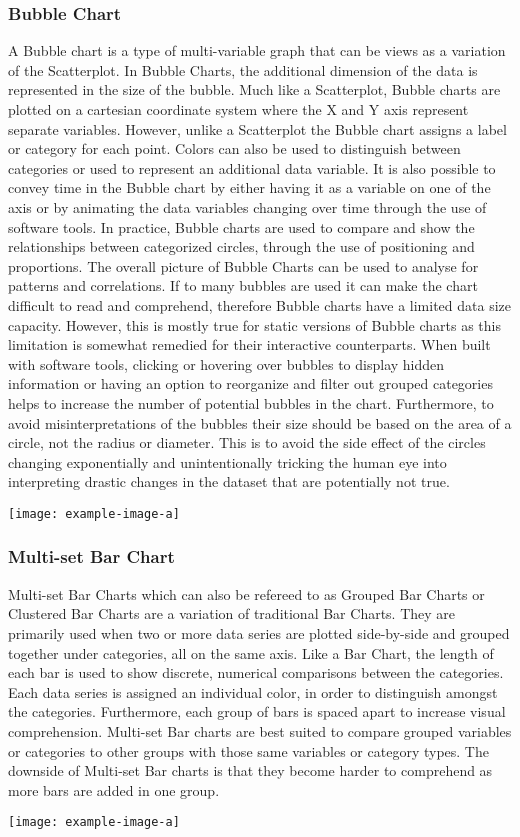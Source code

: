 \subsubsection{Bubble Chart}
A Bubble chart is a type of multi-variable graph that can be views as a variation 
of the Scatterplot. In Bubble Charts, the additional dimension of the data is represented 
in the size of the bubble. Much like a Scatterplot, Bubble charts are plotted on 
a cartesian coordinate system where the X and Y axis represent separate variables. 
However, unlike a Scatterplot the Bubble chart assigns a label or category for
each point. Colors can also be used to distinguish between categories or used to 
represent an additional data variable. It is also possible to convey time in the
Bubble chart by either having it as a variable on one of the axis or by animating 
the data variables changing over time through the use of software tools. In practice,
Bubble charts are used to compare and show the relationships between categorized 
circles, through the use of positioning and proportions. The overall picture of 
Bubble Charts can be used to analyse for patterns and correlations. If to many bubbles 
are used it can make the chart difficult to read and comprehend, therefore Bubble 
charts have a limited data size capacity. However, this is mostly true for static 
versions of Bubble charts as this limitation is somewhat remedied for their interactive 
counterparts. When built with software tools, clicking or hovering over bubbles 
to display hidden information or having an option to reorganize and filter out 
grouped categories helps to increase the number of potential bubbles in the chart. 
Furthermore, to avoid misinterpretations of the bubbles their size should be based 
on the area of a circle, not the radius or diameter. This is to avoid the side 
effect of the circles changing exponentially and unintentionally tricking the 
human eye into interpreting drastic changes in the dataset that are potentially 
not true.

\texttt{[image: example-image-a]} 

\subsubsection{Multi-set Bar Chart}
Multi-set Bar Charts which can also be refereed to as Grouped Bar Charts or Clustered 
Bar Charts are a variation of traditional Bar Charts. They are primarily used when 
two or more data series are plotted side-by-side and grouped together under categories, 
all on the same axis. Like a Bar Chart, the length of each bar is used to show 
discrete, numerical comparisons between the categories. Each data series is assigned 
an individual color, in order to distinguish amongst the categories. Furthermore, 
each group of bars is spaced apart to increase visual comprehension. Multi-set 
Bar charts are best suited to compare grouped variables or categories to other 
groups with those same variables or category types. The downside of Multi-set Bar 
charts is that they become harder to comprehend as more bars are added in one 
group.

\texttt{[image: example-image-a]} 